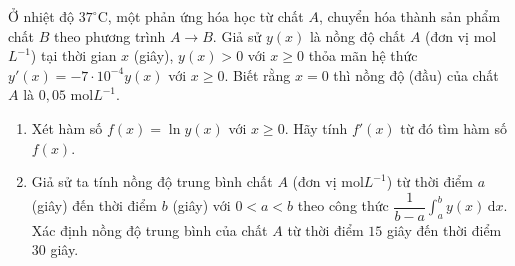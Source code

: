 \begin{bt}%
	Ở nhiệt độ $37^\circ$C, một phản ứng hóa học từ chất $A$, chuyển hóa thành sản phẩm chất $B$ theo phương trình $A\to B$. Giả sử $y(x)$ là nồng độ  chất $A$ (đơn vị mol$L^{-1}$) tại thời gian $x$ (giây), $y(x)>0$ với $x\ge 0$ thỏa mãn hệ thức $y'(x)=-7\cdot 10^{-4}y(x)$ với $x\ge 0$. Biết rằng $x=0$ thì nồng độ (đầu) của chất $A$ là $0{,}05$ mol$L^{-1}$.
	\begin{enumerate}
		\item Xét hàm số $f(x)=\ln y(x)$ với $x\ge 0$. Hãy tính $f'(x)$ từ đó tìm  hàm số $f(x)$.
		\item Giả sử ta tính nồng độ trung bình chất $A$ (đơn vị mol$L^{-1}$) từ thời điểm $a$ (giây) đến thời điểm $b$ (giây) với $0<a<b$ theo công thức $\displaystyle \dfrac{1}{b-a}\int_a^b y(x)\mathrm{\,d}x$. Xác định nồng độ trung bình của chất $A$ từ thời điểm $15$ giây đến thời điểm $30$ giây. 
	\end{enumerate}
\end{bt}

